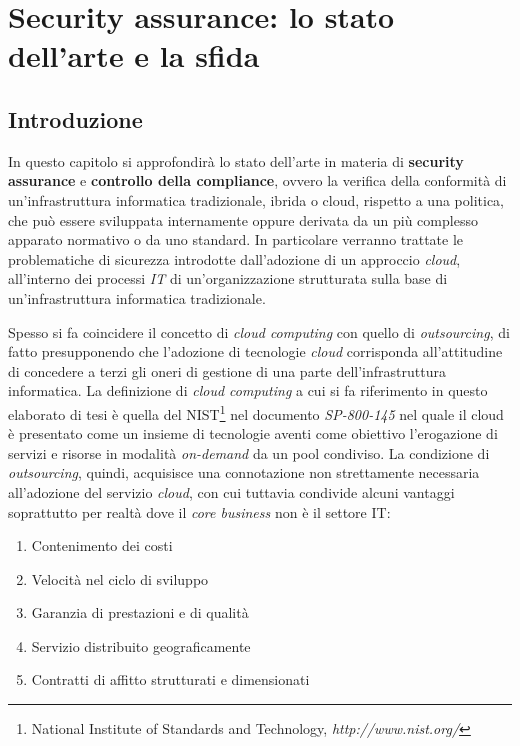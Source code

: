 \documentclass[../main.tex]{subfiles}
\begin{document}
\chapter{Security assurance: lo stato dell'arte e la sfida}
\section{Introduzione}
In questo capitolo si approfondirà lo stato dell'arte in materia di \textbf{security assurance} e \textbf{controllo della compliance}, ovvero la verifica della conformità di un'infrastruttura informatica tradizionale, ibrida o cloud, rispetto a una politica, che può essere sviluppata internamente oppure derivata da un più complesso apparato normativo o da uno standard.
In particolare verranno trattate le problematiche di sicurezza introdotte dall'adozione di un approccio \textit{cloud}, all'interno dei processi \textit{IT} di un'organizzazione strutturata sulla base di un'infrastruttura informatica tradizionale.

Spesso si fa coincidere il concetto di \textit{cloud computing} con quello di \textit{outsourcing}, di fatto presupponendo che l'adozione di tecnologie \textit{cloud} corrisponda all'attitudine di concedere a terzi gli oneri di gestione di una parte dell'infrastruttura informatica.
La definizione di \textit{cloud computing} a cui si fa riferimento in questo elaborato di tesi è quella del NIST\footnote{National Institute of Standards and Technology, \textit{http://www.nist.org/}} nel documento \textit{SP-800-145}\cite{NISTCloud} nel quale il cloud è presentato come un insieme di tecnologie aventi come obiettivo l'erogazione di servizi e risorse in modalità \textit{on-demand} da un pool condiviso.
La condizione di \textit{outsourcing}, quindi, acquisisce una connotazione non strettamente necessaria all'adozione del servizio \textit{cloud}, con cui tuttavia condivide alcuni vantaggi\cite{OutsourcingCloud} soprattutto per realtà dove il \textit{core business} non è il settore IT:
\begin{enumerate}
\item Contenimento dei costi
\item Velocità nel ciclo di sviluppo
\item Garanzia di prestazioni e di qualità
\item Servizio distribuito geograficamente
\item Contratti di affitto strutturati e dimensionati
\end{enumerate}
\end{document}
